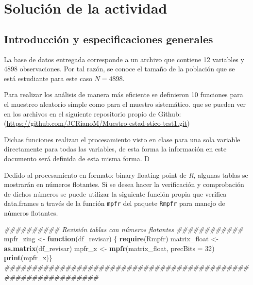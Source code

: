 \documentclass[
]{article}
\newenvironment{Shaded}{\begin{snugshade}}{\end{snugshade}}
\newcommand{\CommentTok}[1]{\textcolor[rgb]{0.56,0.35,0.01}{\textit{#1}}}
\newcommand{\ControlFlowTok}[1]{\textcolor[rgb]{0.13,0.29,0.53}{\textbf{#1}}}
\newcommand{\DataTypeTok}[1]{\textcolor[rgb]{0.13,0.29,0.53}{#1}}
\newcommand{\DecValTok}[1]{\textcolor[rgb]{0.00,0.00,0.81}{#1}}
\newcommand{\KeywordTok}[1]{\textcolor[rgb]{0.13,0.29,0.53}{\textbf{#1}}}
\newcommand{\NormalTok}[1]{#1}
\newcommand{\StringTok}[1]{\textcolor[rgb]{0.31,0.60,0.02}{#1}}
\begin{document}
\hypertarget{soluciuxf3n-de-la-actividad}{%
\section{Solución de la actividad}\label{soluciuxf3n-de-la-actividad}}

\hypertarget{introducciuxf3n-y-especificaciones-generales}{%
\subsection{Introducción y especificaciones
generales}\label{introducciuxf3n-y-especificaciones-generales}}

La base de datos entregada corresponde a un archivo que contiene 12
variables y 4898 observaciones. Por tal razón, se conoce el tamaño de la
población que se está estudiante para este caso \(N = 4898\).

Para realizar los análisis de manera más eficiente se definieron 10
funciones para el muestreo aleatorio simple como para el muestro
sistemático. que se pueden ver en los archivos en el siguiente
repositorio propio de Github:
(\url{https://github.com/JCRianoM/Muestro-estad-stico-test1.git})

Dichas funciones realizan el procesamiento visto en clase para una sola
variable directamente para todas las variables, de esta forma la
información en este documento será definida de esta misma forma. D

Dedido al procesamiento en formato: binary floating-point de \emph{R},
algunas tablas se mostrarán en números flotantes. Si se desea hacer la
verificación y comprobación de dichos números se puede utilizar la
siguiente función propia que verifica data.frames a través de la función
\texttt{mpfr} del paquete \texttt{Rmpfr} para manejo de números
flotantes.

\begin{Shaded}
\begin{Highlighting}[]
\CommentTok{########## Revisión tablas con números flotantes ############}
\NormalTok{mpfr_zing <-}\StringTok{ }\ControlFlowTok{function}\NormalTok{(df_revisar) \{}
    \KeywordTok{require}\NormalTok{(Rmpfr)}
\NormalTok{    matrix_float <-}\StringTok{ }\KeywordTok{as.matrix}\NormalTok{(df_revisar)}
\NormalTok{    mpfr_x <-}\StringTok{ }\KeywordTok{mpfr}\NormalTok{(matrix_float, }\DataTypeTok{precBits =} \DecValTok{32}\NormalTok{)}
    \KeywordTok{print}\NormalTok{(mpfr_x)\}}
\CommentTok{#############################################################}
\end{Highlighting}
\end{Shaded}
\end{document}
